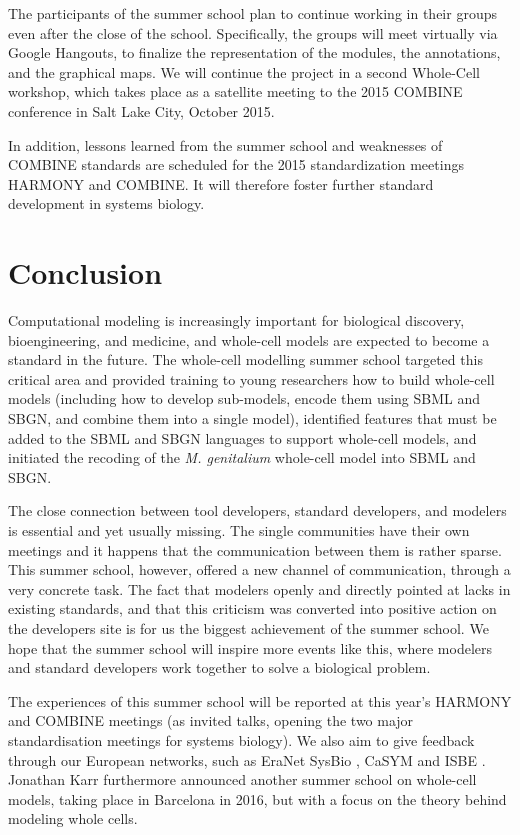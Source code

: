\documentclass[journal,transmag]{IEEEtran}
\begin{document}
The participants of the summer school plan to continue working in their  groups even after the close of the school. 
Specifically, the groups will meet virtually via Google Hangouts, to finalize the representation of the modules, the annotations, and the graphical maps. 
We will continue the project in a second Whole-Cell workshop, which takes place as a satellite meeting to the 2015 COMBINE conference in Salt Lake City, October 2015.

In addition, lessons learned from the summer school and weaknesses of COMBINE standards are scheduled for the 2015 standardization meetings HARMONY and COMBINE.  It will therefore foster further standard development in systems biology. 

\section{Conclusion}
Computational modeling is increasingly important for biological discovery, bioengineering, and medicine, and whole-cell models are expected to become a standard in the future. 
The whole-cell modelling summer school targeted this critical area and  provided  training to young researchers how to build whole-cell models (including how to develop sub-models, encode them using SBML and SBGN, and  combine them into a single model), identified features that must be added to the SBML and SBGN languages to support  whole-cell models, and initiated the recoding of the \textit{M. genitalium} whole-cell model into SBML and SBGN.

The close connection between tool developers, standard developers, and modelers is essential and yet usually missing. 
The single communities have their own meetings and it happens that the communication between them is rather sparse. 
This summer school, however, offered a new channel of communication, through a very concrete task. 
The fact that modelers openly and directly pointed at lacks in existing standards, and that this criticism was converted into positive action on the developers site is for us the biggest achievement of the summer school. 
We hope that the summer school will inspire more events like this, where modelers and standard developers work together to solve a biological problem.

The experiences of this summer school will be reported at this year's HARMONY and COMBINE meetings (as invited talks, opening the two major standardisation meetings for
systems biology). 
We also aim to give feedback through our European networks, such as EraNet SysBio \cite{ERASysBio2015}, CaSYM \cite{CaSYM2015} and ISBE \cite{Wolkenhauer2009}.
Jonathan Karr furthermore announced another summer school on whole-cell models, taking place in Barcelona in 2016, but with a focus on the theory behind modeling whole cells.
\end{document}
